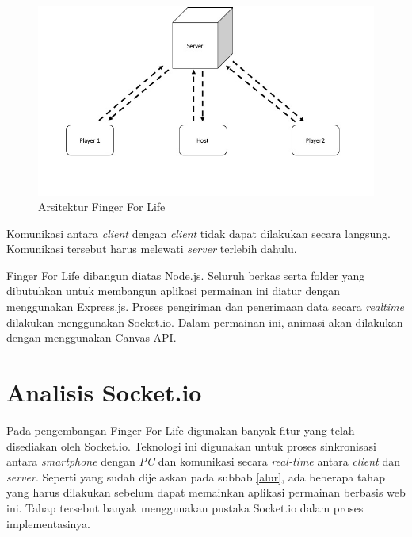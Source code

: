 \begin{figure}[H]
	\centering
	\includegraphics[scale=0.45]{Gambar/ars_fingerforlife}
	\caption{Arsitektur Finger For Life}
	\label{fig:ars_fingerforlife}
\end{figure}

Komunikasi antara \textit{client} dengan \textit{client} tidak dapat dilakukan secara langsung. Komunikasi tersebut harus melewati \textit{server} terlebih dahulu. 

Finger For Life dibangun diatas Node.js. Seluruh berkas serta folder yang dibutuhkan untuk membangun aplikasi permainan ini diatur dengan menggunakan Express.js. Proses pengiriman dan penerimaan data secara \textit{realtime} dilakukan menggunakan Socket.io. Dalam permainan ini, animasi akan dilakukan dengan menggunakan Canvas API.

\section{Analisis Socket.io}
Pada pengembangan Finger For Life digunakan banyak fitur yang telah disediakan oleh Socket.io. Teknologi ini digunakan untuk proses sinkronisasi antara \textit{smartphone} dengan \textit{PC} dan komunikasi secara \textit{real-time} antara \textit{client} dan \textit{server}. Seperti yang sudah dijelaskan pada subbab \ref{alur}, ada beberapa tahap yang harus dilakukan sebelum dapat memainkan aplikasi permainan berbasis web ini. Tahap tersebut banyak menggunakan pustaka Socket.io dalam proses implementasinya.

